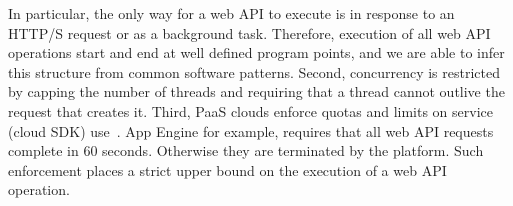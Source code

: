 In particular, the only way for a web API to execute is in response
to an HTTP/S request or as a background task.  Therefore, execution of
all web API operations start and end at well defined program points, and
we are able to infer this structure from common software patterns.  Second,
concurrency is restricted by capping the number of threads
and requiring that a thread cannot outlive the request
that creates it.  Third, PaaS clouds enforce quotas and limits on service
(cloud SDK) use~\cite{azure-limits,gae-limits,gae-sandbox}.
App Engine for example, requires that all web API requests complete in 60 seconds.
Otherwise they are terminated by the platform. 
Such enforcement places a strict upper bound on the
execution of a web API operation.
